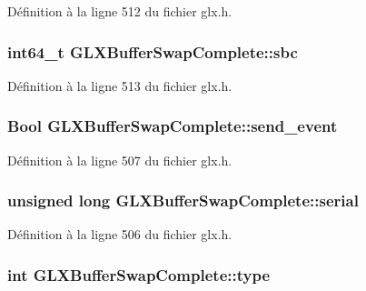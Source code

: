 Définition à la ligne 512 du fichier glx.\-h.

\hypertarget{struct_g_l_x_buffer_swap_complete_a0830bc671be1a7ef8bceff791f3463a7}{
\subsubsection[{sbc}]{\setlength{\rightskip}{0pt plus 5cm}int64\-\_\-t G\-L\-X\-Buffer\-Swap\-Complete\-::sbc}}\label{struct_g_l_x_buffer_swap_complete_a0830bc671be1a7ef8bceff791f3463a7}


Définition à la ligne 513 du fichier glx.\-h.

\hypertarget{struct_g_l_x_buffer_swap_complete_a991953f319d092b7399c02d256ef00e6}{
\subsubsection[{send\-\_\-event}]{\setlength{\rightskip}{0pt plus 5cm}Bool G\-L\-X\-Buffer\-Swap\-Complete\-::send\-\_\-event}}\label{struct_g_l_x_buffer_swap_complete_a991953f319d092b7399c02d256ef00e6}


Définition à la ligne 507 du fichier glx.\-h.

\hypertarget{struct_g_l_x_buffer_swap_complete_ac52e1c5b9b030dd77e9d32f2eb5450da}{
\subsubsection[{serial}]{\setlength{\rightskip}{0pt plus 5cm}unsigned long G\-L\-X\-Buffer\-Swap\-Complete\-::serial}}\label{struct_g_l_x_buffer_swap_complete_ac52e1c5b9b030dd77e9d32f2eb5450da}


Définition à la ligne 506 du fichier glx.\-h.

\hypertarget{struct_g_l_x_buffer_swap_complete_a24826cc08d5619285041846b29ce698c}{
\subsubsection[{type}]{\setlength{\rightskip}{0pt plus 5cm}int G\-L\-X\-Buffer\-Swap\-Complete\-::type}}\label{struct_g_l_x_buffer_swap_complete_a24826cc08d5619285041846b29ce698c}


